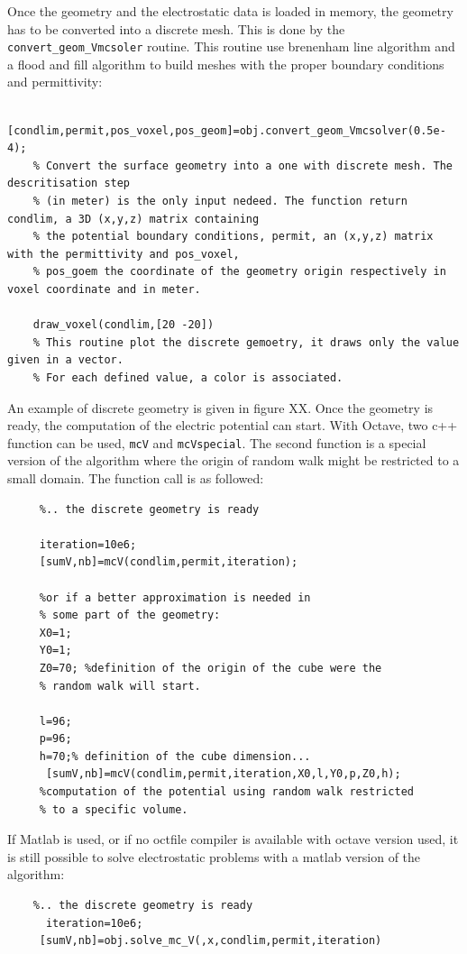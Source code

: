 \documentclass[10pt]{article}
\begin{document}
    Once the geometry and the electrostatic data is loaded in memory, the geometry has to be converted into a discrete mesh. This is done by the \lstinline{convert_geom_Vmcsoler} routine.
    This routine use brenenham line algorithm and a flood and fill algorithm to build meshes with the proper boundary conditions and permittivity:
       
	\begin{lstlisting}
	[condlim,permit,pos_voxel,pos_geom]=obj.convert_geom_Vmcsolver(0.5e-4);
	% Convert the surface geometry into a one with discrete mesh. The descritisation step
	% (in meter) is the only input nedeed. The function return condlim, a 3D (x,y,z) matrix containing
	% the potential boundary conditions, permit, an (x,y,z) matrix with the permittivity and pos_voxel,
	% pos_goem the coordinate of the geometry origin respectively in voxel coordinate and in meter. 
	
	draw_voxel(condlim,[20 -20])
	% This routine plot the discrete gemoetry, it draws only the value given in a vector.
	% For each defined value, a color is associated.
	\end{lstlisting}       
	
	An example of discrete geometry is given in figure XX. Once the geometry is ready, the computation of the electric potential can start.
	 With Octave, two c++ function can be used, \lstinline{mcV} and \lstinline{mcVspecial}. The second function is a special version of the algorithm where the origin of random walk might be restricted to a small domain. The function call is as followed:
	 
	 \begin{lstlisting}
	 %.. the discrete geometry is ready
	 
	 iteration=10e6;
	 [sumV,nb]=mcV(condlim,permit,iteration);
	 
	 %or if a better approximation is needed in 
	 % some part of the geometry:
	 X0=1;
	 Y0=1;
	 Z0=70; %definition of the origin of the cube were the 
	 % random walk will start.
	 
	 l=96; 
	 p=96;
	 h=70;% definition of the cube dimension...
	  [sumV,nb]=mcV(condlim,permit,iteration,X0,l,Y0,p,Z0,h);
	 %computation of the potential using random walk restricted
	 % to a specific volume.
	 \end{lstlisting}
	
	If Matlab is used, or if no octfile compiler is available with octave version used, it is still possible to solve electrostatic problems with a matlab version of the algorithm:
	 \begin{lstlisting}
	%.. the discrete geometry is ready
	  iteration=10e6;
	 [sumV,nb]=obj.solve_mc_V(,x,condlim,permit,iteration)
	 \end{lstlisting}
	 
\end{document}
